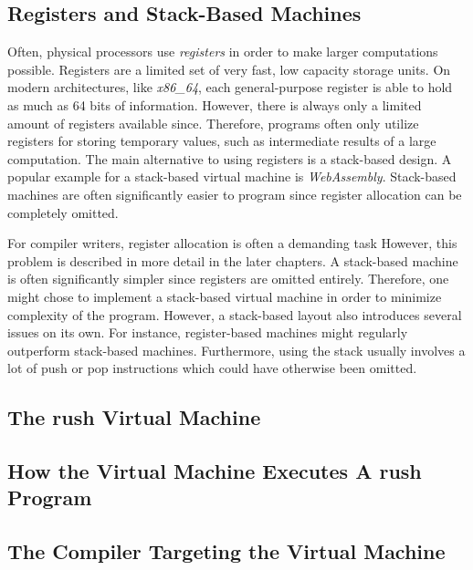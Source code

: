 \subsection{Registers and Stack-Based Machines}

Often, physical processors use \emph{registers} in order to make larger computations possible.
Registers are a limited set of very fast, low capacity storage units.
On modern architectures, like \emph{x86\_64}, each general-purpose register is able to hold as much as 64 bits of information.
However, there is always only a limited amount of registers available since.
Therefore, programs often only utilize registers for storing temporary values, such as intermediate results of a large computation.
The main alternative to using registers is a stack-based design.
A popular example for a stack-based virtual machine is \emph{WebAssembly}.
Stack-based machines are often significantly easier to program since register allocation can be completely omitted.

For compiler writers, register allocation is often a demanding task
However, this problem is described in more detail in the later chapters.
A stack-based machine is often significantly simpler since registers are omitted entirely.
Therefore, one might chose to implement a stack-based virtual machine in order to minimize complexity of the program.
However, a stack-based layout also introduces several issues on its own.
For instance, register-based machines might regularly outperform stack-based machines.
Furthermore, using the stack usually involves a lot of push or pop instructions which could have otherwise been omitted.

\subsection{The rush Virtual Machine}


\subsection{How the Virtual Machine Executes A rush Program}
\subsection{The Compiler Targeting the Virtual Machine}
